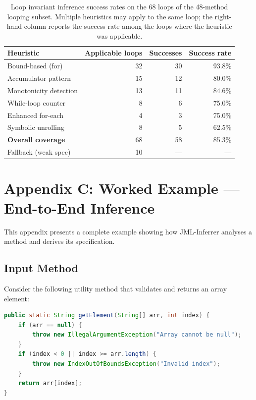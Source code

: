 \documentclass[11pt]{article}
\begin{document}
\begin{table}[ht]
\centering
\caption{Loop invariant inference success rates on the 68 loops of the 48-method looping subset. Multiple heuristics may apply to the same loop; the right-hand column reports the success rate among the loops where the heuristic was applicable.}
\label{tab:loop-heuristics}
\begin{tabular}{lrrr}
\toprule
\textbf{Heuristic} & \textbf{Applicable loops} & \textbf{Successes} & \textbf{Success rate} \\
\midrule
Bound-based (for)       & 32 & 30 & 93.8\% \\
Accumulator pattern     & 15 & 12 & 80.0\% \\
Monotonicity detection  & 13 & 11 & 84.6\% \\
While-loop counter      &  8 &  6 & 75.0\% \\
Enhanced for-each       &  4 &  3 & 75.0\% \\
Symbolic unrolling      &  8 &  5 & 62.5\% \\
\midrule
\textbf{Overall coverage}  & 68 & 58 & 85.3\% \\
Fallback (weak spec)       & 10 & --- & ---   \\
\bottomrule
\end{tabular}
\end{table}

\section{Appendix C: Worked Example --- End-to-End Inference}
\label{app:worked-example}

This appendix presents a complete example showing how JML-Inferrer analyses a method and derives its specification.

\subsection{Input Method}

Consider the following utility method that validates and returns an array element:

\begin{lstlisting}[language=Java, caption={Input method before specification inference}, label={lst:before-supp}]
public static String getElement(String[] arr, int index) {
    if (arr == null) {
        throw new IllegalArgumentException("Array cannot be null");
    }
    if (index < 0 || index >= arr.length) {
        throw new IndexOutOfBoundsException("Invalid index");
    }
    return arr[index];
}
\end{lstlisting}
\end{document}
